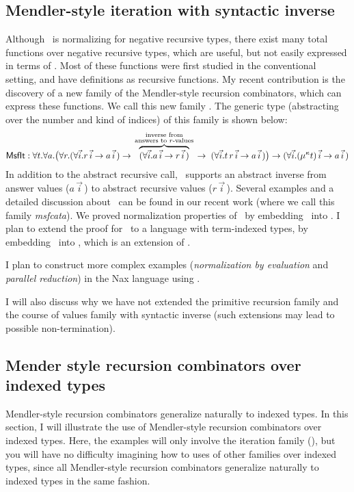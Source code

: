 \subsection{Mendler-style iteration with syntactic inverse}
Although \MIt\ is normalizing for negative recursive types, there exist many
total functions over negative recursive types, which are useful, but not easily
expressed in terms of \MIt. Most of these functions were first studied in
the conventional setting, and have definitions as recursive functions.
My recent contribution is the discovery of a new family of the Mendler-style
recursion combinators, which can express these functions. We call this new
family \MsfIt. The generic type (abstracting over the number and kind of
indices) of this family is shown below:
\label{sec:mendler:sf}
\[
 \textsf{MsfIt} : \forall t . \forall a .
   \big( \forall r.
            (\forall\vec{i} . r\,\vec{i} -> a\,\vec{i}\,)
   -> \overset{\begin{smallmatrix}
                        \text{inverse from} \\
                        \text{answers to $r$-values} \\
                       \end{smallmatrix}}{\overbrace{
            (\forall\vec{i} . a\,\vec{i} -> r\,\vec{i}\,) }}
   -> \;    (\forall\vec{i} . t \, r\,\vec{i} -> a\,\vec{i}\,)
   \big)
 -> (\forall\vec{i} . (\mu^\kappa t)\,\vec{i} -> a\,\vec{i}\,)
\]
In addition to the abstract recursive call, \MsfIt\ supports an abstract
inverse from answer values ($a \,\vec{i}\,$) to abstract recursive values
($r\,\vec{i}\,$). Several examples and a detailed discussion about \MsfIt\
can be found in our recent work \cite{AhnShe11} (where we call this family
\textit{msfcata}). We \cite{AhnShe11} proved normalization properties of
\MsfIt\ by embedding \MsfIt\ into \Fw. I plan to extend the proof for \MsfIt\,
to a language with term-indexed types, by embedding \MsfIt\ into \Fi, which is
an extension of \Fw.

I plan to construct more complex examples
(\emph{normalization by evaluation} and \emph{parallel reduction})
in the Nax language using \MsfIt.

I will also discuss why we have not extended the primitive recursion family
and the course of values family with syntactic inverse (such extensions
may lead to possible non-termination).

\subsection{Mender style recursion combinators over indexed types}
\label{sec:mendler:ix}
Mendler-style recursion combinators generalize naturally to indexed types.
In this section, I will illustrate the use of Mendler-style
recursion combinators over indexed types. Here, the examples will only
involve the iteration family (\MIt), but you will have no difficulty
imagining how to uses of other families over indexed types, since all
Mendler-style recursion combinators generalize naturally to indexed types
in the same fashion.

